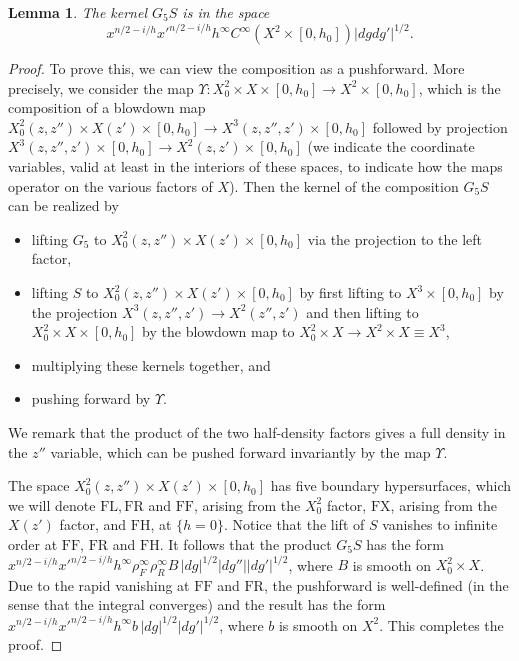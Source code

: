 \documentclass[10pt, a4paper, twoside]{amsart}
\numberwithin{equation}{section}
\newtheorem{lemma}[theorem]{Lemma}
\theoremstyle{remark}
\begin{document}
\begin{lemma}
The kernel $G_5 S$ is in the space
$$
x^{n/2-i/h} {x'}^{n/2-i/h} h^\infty C^\infty(X^2 \times [0, h_0]) |dg dg'|^{1/2}.
$$
\end{lemma}

\begin{proof} 
To prove this, we can view the composition as a pushforward. More precisely, we consider the map $\Upsilon: X^2_0 \times X \times [0, h_0]\to X^2\times [0, h_0]$, which is the composition of a blowdown map $X^2_0(z, z'') \times X(z') \times [0, h_0]\to X^3(z, z'', z')\times [0, h_0]$ followed by projection $X^3(z, z'', z')\times [0, h_0] \to X^2(z, z')\times [0, h_0]$ (we indicate the coordinate variables, valid at least in the interiors of these spaces, to indicate how the maps operator on the various factors of $X$). Then the kernel of the composition $G_5 S$ can be realized by 
\begin{itemize}
\item 
lifting $G_5$ to $X^2_0(z, z'') \times X(z') \times [0, h_0]$ via the projection to the left factor, 
\item 
lifting $S$ to $X^2_0(z, z'') \times X(z')\times [0, h_0]$ by first lifting to $X^3\times [0, h_0]$ by the projection $X^3(z, z'', z') \to X^2(z'', z')$ and then lifting to $X^2_0 \times X \times [0, h_0]$ by the blowdown map to $X^2_0 \times X \to X^2 \times X \equiv X^3$,
\item 
multiplying these kernels together, and
\item
pushing forward by $\Upsilon$. 
\end{itemize}
We remark that the product of the two half-density factors gives a full density in the $z''$ variable, which can be pushed forward invariantly by the map $\Upsilon$. 

The space $X^2_0(z, z'') \times X(z') \times [0, h_0]$ has five boundary hypersurfaces, which we will denote ${\mathrm{FL}}, {\mathrm{FR}}$ and ${\mathrm{FF}}$, arising from the $X^2_0$ factor, $\mathrm{FX}$, arising from the $X(z')$ factor, and $\mathrm{FH}$, at $\{ h = 0 \}$. Notice that the lift of $S$ vanishes to infinite order at ${\mathrm{FF}}$, ${\mathrm{FR}}$ and $\mathrm{FH}$. It follows that the product $G_5 S$ has the form $x^{n/2-i/h} {x'}^{n/2-i/h} h^\infty \rho_F^\infty \rho_R^\infty B \, |dg|^{1/2} |dg''| |dg'|^{1/2}$, where $B$ is smooth on $X^2_0\times X$. 
Due to the rapid vanishing at ${\mathrm{FF}}$ and ${\mathrm{FR}}$, the pushforward is well-defined (in the sense that the integral converges) and the result has the form $x^{n/2-i/h} {x'}^{n/2-i/h} h^\infty b  \,  |dg|^{1/2}  |dg'|^{1/2}$, where $b$ is smooth on $X^2$. This completes the proof.
\end{proof}
\end{document}
